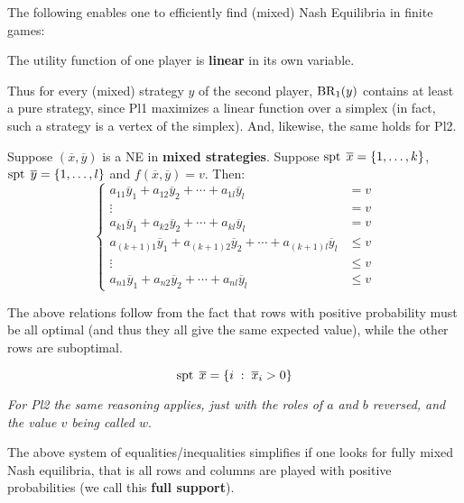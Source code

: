 \documentclass[../main.tex]{subfiles}
\begin{document}
The following enables one to efficiently find (mixed) Nash Equilibria in finite games:
\begin{remark}
    The utility function of one player is \textbf{linear} in its own variable.
\end{remark}
Thus for every (mixed) strategy $y$ of the second player, $\operatorname{BR}_1(y)$ contains at least a pure strategy, since Pl1 maximizes a linear function over a simplex (in fact, such a strategy is a vertex of the simplex). And, likewise, the same holds for Pl2.

\begin{remark}
    Suppose $(\overline{x}, \overline{y})$ is a NE in \textbf{mixed strategies}. Suppose $\operatorname{spt\;} \overline{x} = \{1, \ldots, k\}$, $\operatorname{spt\;} \overline{y} = \{1, \ldots, l\}$ and $f(\overline{x}, \overline{y}) = v$. Then:
    \[
        \begin{cases}
            a_{11}\overline{y}_1 + a_{12}\overline{y}_2 + \cdots + a_{1l}\overline{y}_l             & = v    \\
            \vdots                                                                                  & =v     \\
            a_{k1}\overline{y}_1 + a_{k2}\overline{y}_2 + \cdots + a_{kl}\overline{y}_l             & = v    \\
            a_{(k+1)1}\overline{y}_1 + a_{(k+1)2}\overline{y}_2 + \cdots + a_{(k+1)l}\overline{y}_l & \leq v \\
            \vdots                                                                                  & \leq v \\
            a_{n1}\overline{y}_1 + a_{n2}\overline{y}_2 + \cdots + a_{nl}\overline{y}_l             & \leq v
        \end{cases}
    \]

    The above relations follow from the fact that rows with positive probability must be all optimal (and thus they all give the same expected value), while the other rows are suboptimal.
    \begin{note}
        \[
            \operatorname{spt\;} \overline{x} = \{i \; : \; \overline{x}_i > 0\}
        \]
    \end{note}
    \textit{For Pl2 the same reasoning applies, just with the roles of $a$ and $b$ reversed, and the value $v$ being called $w$}.
\end{remark}
The above system of equalities/inequalities simplifies if one looks for fully mixed Nash equilibria, that is all rows and columns are played with positive probabilities (we call this \textbf{full support}).
\end{document}
